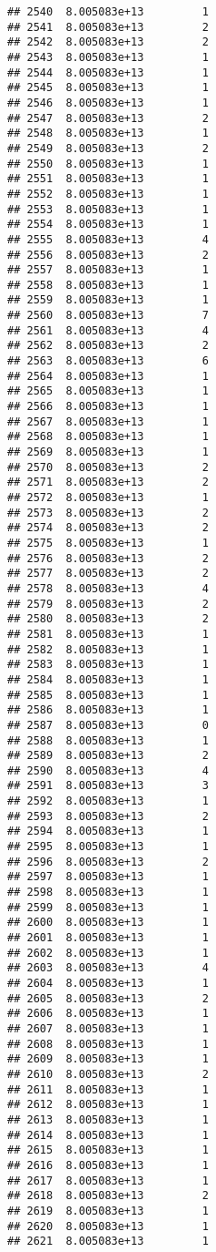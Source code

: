 \documentclass[
]{article}
\begin{document}
\begin{verbatim}
## 2540  8.005083e+13         1
## 2541  8.005083e+13         2
## 2542  8.005083e+13         2
## 2543  8.005083e+13         1
## 2544  8.005083e+13         1
## 2545  8.005083e+13         1
## 2546  8.005083e+13         1
## 2547  8.005083e+13         2
## 2548  8.005083e+13         1
## 2549  8.005083e+13         2
## 2550  8.005083e+13         1
## 2551  8.005083e+13         1
## 2552  8.005083e+13         1
## 2553  8.005083e+13         1
## 2554  8.005083e+13         1
## 2555  8.005083e+13         4
## 2556  8.005083e+13         2
## 2557  8.005083e+13         1
## 2558  8.005083e+13         1
## 2559  8.005083e+13         1
## 2560  8.005083e+13         7
## 2561  8.005083e+13         4
## 2562  8.005083e+13         2
## 2563  8.005083e+13         6
## 2564  8.005083e+13         1
## 2565  8.005083e+13         1
## 2566  8.005083e+13         1
## 2567  8.005083e+13         1
## 2568  8.005083e+13         1
## 2569  8.005083e+13         1
## 2570  8.005083e+13         2
## 2571  8.005083e+13         2
## 2572  8.005083e+13         1
## 2573  8.005083e+13         2
## 2574  8.005083e+13         2
## 2575  8.005083e+13         1
## 2576  8.005083e+13         2
## 2577  8.005083e+13         2
## 2578  8.005083e+13         4
## 2579  8.005083e+13         2
## 2580  8.005083e+13         2
## 2581  8.005083e+13         1
## 2582  8.005083e+13         1
## 2583  8.005083e+13         1
## 2584  8.005083e+13         1
## 2585  8.005083e+13         1
## 2586  8.005083e+13         1
## 2587  8.005083e+13         0
## 2588  8.005083e+13         1
## 2589  8.005083e+13         2
## 2590  8.005083e+13         4
## 2591  8.005083e+13         3
## 2592  8.005083e+13         1
## 2593  8.005083e+13         2
## 2594  8.005083e+13         1
## 2595  8.005083e+13         1
## 2596  8.005083e+13         2
## 2597  8.005083e+13         1
## 2598  8.005083e+13         1
## 2599  8.005083e+13         1
## 2600  8.005083e+13         1
## 2601  8.005083e+13         1
## 2602  8.005083e+13         1
## 2603  8.005083e+13         4
## 2604  8.005083e+13         1
## 2605  8.005083e+13         2
## 2606  8.005083e+13         1
## 2607  8.005083e+13         1
## 2608  8.005083e+13         1
## 2609  8.005083e+13         1
## 2610  8.005083e+13         2
## 2611  8.005083e+13         1
## 2612  8.005083e+13         1
## 2613  8.005083e+13         1
## 2614  8.005083e+13         1
## 2615  8.005083e+13         1
## 2616  8.005083e+13         1
## 2617  8.005083e+13         1
## 2618  8.005083e+13         2
## 2619  8.005083e+13         1
## 2620  8.005083e+13         1
## 2621  8.005083e+13         1

\end{verbatim}
\end{document}
